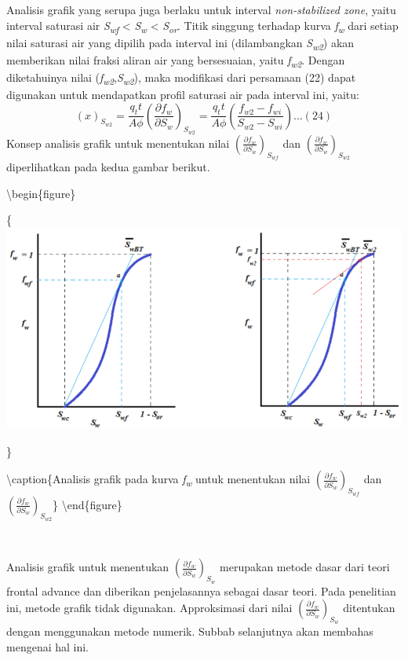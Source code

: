 \documentclass[
]{book}
\begin{document}
Analisis grafik yang serupa juga berlaku untuk interval \emph{non-stabilized zone}, yaitu interval saturasi air \emph{S\textsubscript{wf}} \textless{} \emph{S\textsubscript{w}} \textless{} \emph{S\textsubscript{or}}. Titik singgung terhadap kurva \emph{f\textsubscript{w}} dari setiap nilai saturasi air yang dipilih pada interval ini (dilambangkan \emph{S\textsubscript{w2}}) akan memberikan nilai fraksi aliran air yang bersesuaian, yaitu \emph{f\textsubscript{w2}}. Dengan diketahuinya nilai (\emph{f\textsubscript{w2}},\emph{S\textsubscript{w2}}), maka modifikasi dari persamaan (22) dapat digunakan untuk mendapatkan profil saturasi air pada interval ini, yaitu:
\[(x)_{S_{w2}} = \frac{q_tt}{A\phi} \left( \frac{\partial f_w}{\partial S_w} \right)_{S_{w2}} = \frac{q_tt}{A\phi} \left( \frac{f_{w2} - f_{wi}}{S_{w2} - S_{wi}} \right)...(24)\]
Konsep analisis grafik untuk menentukan nilai \(\left( \frac{\partial f_w}{\partial S_w} \right)_{S_{wf}}\) dan \(\left( \frac{\partial f_w}{\partial S_w} \right)_{S_{w2}}\) diperlihatkan pada kedua gambar berikut.

\textbackslash begin\{figure\}

\{\centering \includegraphics[width=0.75\linewidth]{images/waterflood/perbandingan}

\}

\textbackslash caption\{Analisis grafik pada kurva \emph{f\textsubscript{w}} untuk menentukan nilai \(\left( \frac{\partial f_w}{\partial S_w} \right)_{S_{wf}}\) dan \(\left( \frac{\partial f_w}{\partial S_w} \right)_{S_{w2}}\)\}\label{fig:unnamed-chunk-50}
\textbackslash end\{figure\}

~

Analisis grafik untuk menentukan \(\left( \frac{\partial f_w}{\partial S_w} \right)_{S_w}\) merupakan metode dasar dari teori frontal advance dan diberikan penjelasannya sebagai dasar teori. Pada penelitian ini, metode grafik tidak digunakan. Approksimasi dari nilai \(\left( \frac{\partial f_w}{\partial S_w} \right)_{S_w}\) ditentukan dengan menggunakan metode numerik. Subbab selanjutnya akan membahas mengenai hal ini.
\end{document}
